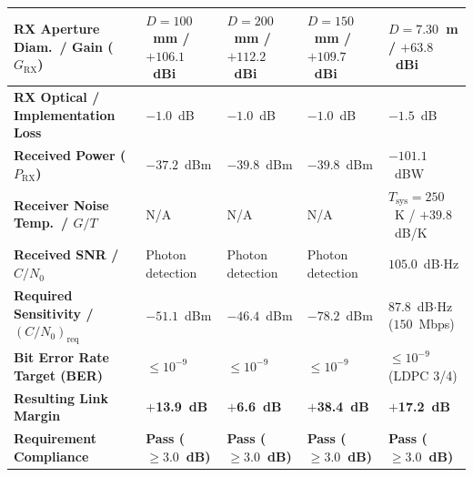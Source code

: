 \begin{table}[H]
{\begin{tabularx}{\textwidth}{|>{\raggedright\arraybackslash}p{4.2cm}|>{\centering\arraybackslash}p{2.6cm}|>{\centering\arraybackslash}p{2.7cm}|>{\centering\arraybackslash}p{2.7cm}|>{\centering\arraybackslash}X|}
    \textbf{RX Aperture Diam.\ / Gain ($G_{\text{RX}}$)} & $D = 100$~mm / $+106.1$~dBi & $D = 200$~mm / $+112.2$~dBi & $D = 150$~mm / $+109.7$~dBi & $D = 7.30$~m / $+63.8$~dBi \\ \hline
    \textbf{RX Optical / Implementation Loss} & $-1.0$~dB & $-1.0$~dB & $-1.0$~dB & $-1.5$~dB \\ \hline
    \textbf{Received Power ($P_{\text{RX}}$)} & $-37.2$~dBm & $-39.8$~dBm & $-39.8$~dBm & $-101.1$~dBW \\ \hline
    \textbf{Receiver Noise Temp.\ / $G/T$} & N/A & N/A & N/A & $T_{\text{sys}} = 250$~K / $+39.8$~dB/K \\ \hline
    \textbf{Received SNR / $C/N_0$} & Photon detection & Photon detection & Photon detection & $105.0$~dB$\cdot$Hz \\ \hline
    \textbf{Required Sensitivity / $(C/N_0)_{\text{req}}$} & $-51.1$~dBm & $-46.4$~dBm & $-78.2$~dBm & $87.8$~dB$\cdot$Hz ($150$~Mbps) \\ \hline
    \textbf{Bit Error Rate Target (BER)} & $\le 10^{-9}$ & $\le 10^{-9}$ & $\le 10^{-9}$ & $\le 10^{-9}$ (LDPC 3/4) \\ \hline
    \rowcolor{TableRowLightBlue}
    \textbf{Resulting Link Margin} & \textbf{$+$13.9~dB} & \textbf{$+$6.6~dB} & \textbf{$+$38.4~dB} & \textbf{$+$17.2~dB} \\ \hline
    \rowcolor{white}
    \textbf{Requirement Compliance} & \textbf{Pass ($\ge 3.0$~dB)} & \textbf{Pass ($\ge 3.0$~dB)} & \textbf{Pass ($\ge 3.0$~dB)} & \textbf{Pass ($\ge 3.0$~dB)} \\ \hline
\end{tabularx}}
\end{table}
